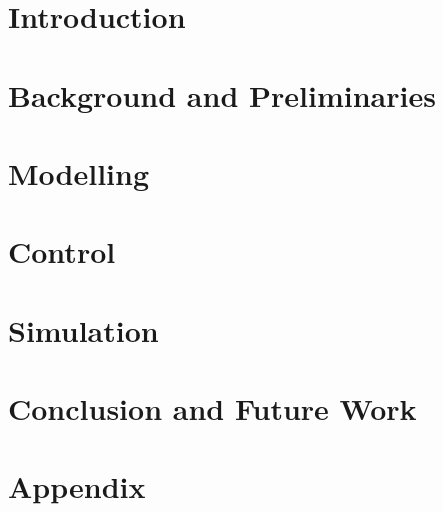\documentclass[10pt,b5paper,openright]{book}
\begin{document}
\tableofcontents
\newpage

\begingroup
\let\cleardoublepage\relax
\let\clearpage\relax
\listoffigures
\newpage
\listoftables
\endgroup


\chapter{Introduction}
\chapter{Background and Preliminaries}
\chapter{Modelling}
\chapter{Control}
\chapter{Simulation}
\chapter{Conclusion and Future Work}

\printbibliography
\newpage
\appendix

\chapter{Appendix}
\end{document}
